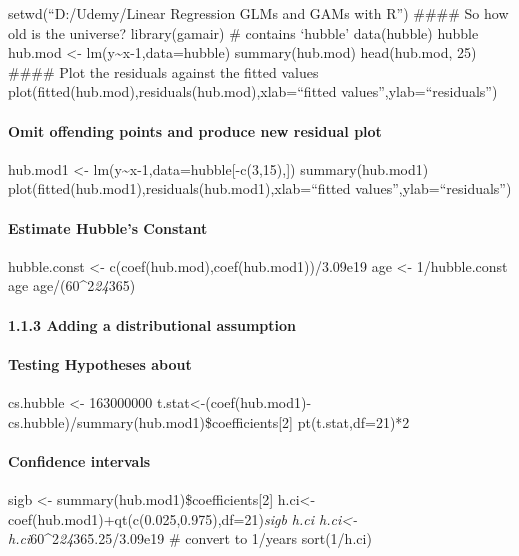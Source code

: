 \documentclass[
]{article}
\author{}
\date{\vspace{-2.5em}}
\begin{document}
setwd(``D:/Udemy/Linear Regression GLMs and GAMs with R'') \#\#\#\# So
how old is the universe? library(gamair) \# contains `hubble'
data(hubble) hubble hub.mod \textless-
lm(y\textasciitilde x-1,data=hubble) summary(hub.mod) head(hub.mod, 25)
\#\#\#\# Plot the residuals against the fitted values
plot(fitted(hub.mod),residuals(hub.mod),xlab=``fitted
values'',ylab=``residuals'')

\hypertarget{omit-offending-points-and-produce-new-residual-plot}{%
\paragraph{Omit offending points and produce new residual
plot}\label{omit-offending-points-and-produce-new-residual-plot}}

hub.mod1 \textless- lm(y\textasciitilde x-1,data=hubble{[}-c(3,15),{]})
summary(hub.mod1)
plot(fitted(hub.mod1),residuals(hub.mod1),xlab=``fitted
values'',ylab=``residuals'')

\hypertarget{estimate-hubbles-constant}{%
\paragraph{Estimate Hubble's Constant}\label{estimate-hubbles-constant}}

hubble.const \textless- c(coef(hub.mod),coef(hub.mod1))/3.09e19 age
\textless- 1/hubble.const age age/(60\^{}2\emph{24}365)

\hypertarget{adding-a-distributional-assumption}{%
\paragraph{1.1.3 Adding a distributional
assumption}\label{adding-a-distributional-assumption}}

\hypertarget{testing-hypotheses-about}{%
\paragraph{\texorpdfstring{Testing Hypotheses about
\beta}{Testing Hypotheses about }}\label{testing-hypotheses-about}}

cs.hubble \textless- 163000000
t.stat\textless-(coef(hub.mod1)-cs.hubble)/summary(hub.mod1)\$coefficients{[}2{]}
pt(t.stat,df=21)*2

\hypertarget{confidence-intervals}{%
\paragraph{Confidence intervals}\label{confidence-intervals}}

sigb \textless- summary(hub.mod1)\$coefficients{[}2{]}
h.ci\textless-coef(hub.mod1)+qt(c(0.025,0.975),df=21)\emph{sigb h.ci
h.ci\textless-h.ci}60\^{}2\emph{24}365.25/3.09e19 \# convert to 1/years
sort(1/h.ci)
\end{document}
